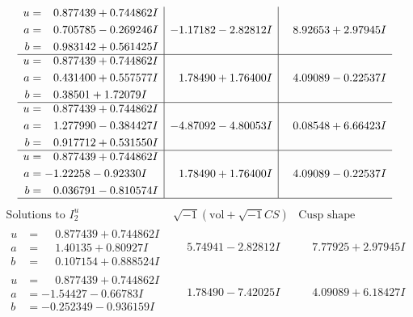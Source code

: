 \documentclass[1p]{elsarticle_modified}
\theoremstyle{definition}
\newcommand{\I}{\sqrt{-1}}
\begin{document}
$$\begin{array}{c|c|c}
\begin{aligned}
u &= \phantom{-}0.877439 + 0.744862 I \\
a &= \phantom{-}0.705785 - 0.269246 I \\
b &= \phantom{-}0.983142 + 0.561425 I\end{aligned}
 & -1.17182 - 2.82812 I & \phantom{-}8.92653 + 2.97945 I \\ \hline\begin{aligned}
u &= \phantom{-}0.877439 + 0.744862 I \\
a &= \phantom{-}0.431400 + 0.557577 I \\
b &= \phantom{-}0.38501 + 1.72079 I\end{aligned}
 & \phantom{-}1.78490 + 1.76400 I & \phantom{-}4.09089 - 0.22537 I \\ \hline\begin{aligned}
u &= \phantom{-}0.877439 + 0.744862 I \\
a &= \phantom{-}1.277990 - 0.384427 I \\
b &= \phantom{-}0.917712 + 0.531550 I\end{aligned}
 & -4.87092 - 4.80053 I & \phantom{-}0.08548 + 6.66423 I \\ \hline\begin{aligned}
u &= \phantom{-}0.877439 + 0.744862 I \\
a &= -1.22258 - 0.92330 I \\
b &= \phantom{-}0.036791 - 0.810574 I\end{aligned}
 & \phantom{-}1.78490 + 1.76400 I & \phantom{-}4.09089 - 0.22537 I\\
 \hline 
 \end{array}$$\newpage$$\begin{array}{c|c|c}  
\text{Solutions to }I^u_{2}& \I (\text{vol} + \sqrt{-1}CS) & \text{Cusp shape}\\
 \hline 
\begin{aligned}
u &= \phantom{-}0.877439 + 0.744862 I \\
a &= \phantom{-}1.40135 + 0.80927 I \\
b &= \phantom{-}0.107154 + 0.888524 I\end{aligned}
 & \phantom{-}5.74941 - 2.82812 I & \phantom{-}7.77925 + 2.97945 I \\ \hline\begin{aligned}
u &= \phantom{-}0.877439 + 0.744862 I \\
a &= -1.54427 - 0.66783 I \\
b &= -0.252349 - 0.936159 I\end{aligned}
 & \phantom{-}1.78490 - 7.42025 I & \phantom{-}4.09089 + 6.18427 I \\ \hline\begin{aligned}

\end{aligned}
\end{array}$$
\end{document}
